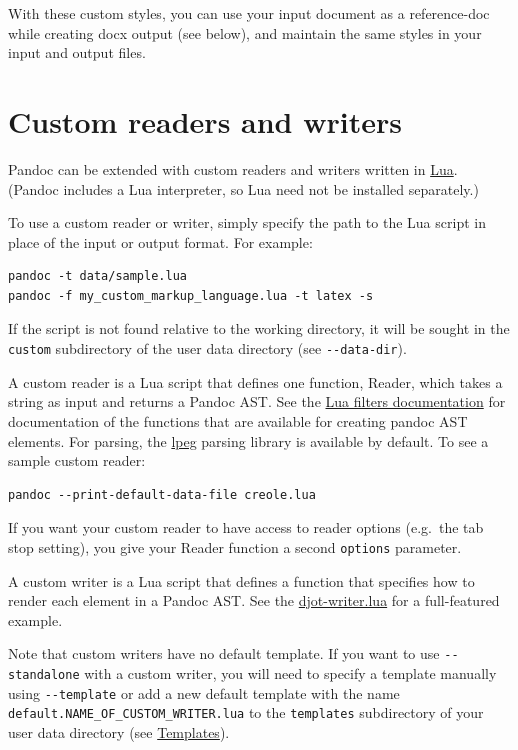 \documentclass[
]{article}
\begin{document}
With these custom styles, you can use your input document as a
reference-doc while creating docx output (see below), and maintain the
same styles in your input and output files.

\hypertarget{custom-readers-and-writers}{%
\section{Custom readers and writers}\label{custom-readers-and-writers}}

Pandoc can be extended with custom readers and writers written in
\href{https://www.lua.org}{Lua}. (Pandoc includes a Lua interpreter, so
Lua need not be installed separately.)

To use a custom reader or writer, simply specify the path to the Lua
script in place of the input or output format. For example:

\begin{verbatim}
pandoc -t data/sample.lua
pandoc -f my_custom_markup_language.lua -t latex -s
\end{verbatim}

If the script is not found relative to the working directory, it will be
sought in the \texttt{custom} subdirectory of the user data directory
(see \texttt{-\/-data-dir}).

A custom reader is a Lua script that defines one function, Reader, which
takes a string as input and returns a Pandoc AST. See the
\href{https://pandoc.org/lua-filters.html}{Lua filters documentation}
for documentation of the functions that are available for creating
pandoc AST elements. For parsing, the
\href{http://www.inf.puc-rio.br/~roberto/lpeg/}{lpeg} parsing library is
available by default. To see a sample custom reader:

\begin{verbatim}
pandoc --print-default-data-file creole.lua
\end{verbatim}

If you want your custom reader to have access to reader options
(e.g.~the tab stop setting), you give your Reader function a second
\texttt{options} parameter.

A custom writer is a Lua script that defines a function that specifies
how to render each element in a Pandoc AST. See the
\href{https://github.com/jgm/djot.lua/blob/main/djot-writer.lua}{djot-writer.lua}
for a full-featured example.

Note that custom writers have no default template. If you want to use
\texttt{-\/-standalone} with a custom writer, you will need to specify a
template manually using \texttt{-\/-template} or add a new default
template with the name \texttt{default.NAME\_OF\_CUSTOM\_WRITER.lua} to
the \texttt{templates} subdirectory of your user data directory (see
\protect\hyperlink{templates}{Templates}).
\end{document}
